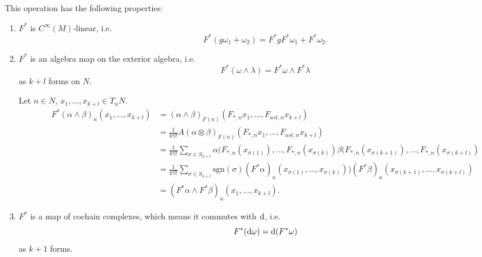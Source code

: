 This operation has the following properties:
\begin{enumerate}
  \item{
    $F^\ast$ is $C^\infty(M)$-linear, i.e.
    $$
      F^\ast(g \omega_1 + \omega_2)
    = F^\ast g F^\ast \omega_1 + F^\ast \omega_2.
    $$
  }
  \item{
    $F^\ast$ is an algebra map on the exterior algebra, i.e.
    $$
      F^\ast(\omega \wedge \lambda)
    = F^\ast \omega \wedge F^\ast \lambda
    $$
    as $k + l$ forms on $N$.

    Let $n \in N$, $x_1, \dots, x_{k+l} \in T_n N$.
    \begin{align*}
       F^\ast(\alpha \wedge \beta)_n(x_1, \dots, x_{k+l})
    &= (\alpha \wedge \beta)_{F(n)}
         (F_{\ast,n} x_1, \dots, F_{ast, n} x_{k+l}) \\
    &= \frac{1}{k! l!}
         A(\alpha \otimes \beta)_{F(n)}
           (F_{\ast,n} x_1, \dots, F_{ast, n} x_{k+l}) \\
    &= \frac{1}{k! l!}
         \sum_{\sigma \in S_{k+l}}
           \alpha(F_{\ast, n}(x_{\sigma(1)}),
                  \dots,
                  F_{\ast,n}(x_{\sigma(k)})
           \beta(F_{\ast, n}(x_{\sigma(k+1)}),
                 \dots,
                 F_{\ast, n}(x_{\sigma(k+l)}) \\
    &= \frac{1}{k! l!}
         \sum_{\sigma \in S_{k+l}}
           \mathrm{sgn}(\sigma)
             (F^\ast \alpha)_n
               (x_{\sigma(1)},
                \dots,
                x_{\sigma(k)}))
             (F^\ast \beta)_n
               (x_{\sigma(k+1)},
                \dots,
                x_{\sigma(k+l)}) \\
    &= (F^\ast \alpha \wedge F^\ast \beta)_n
         (x_1, \dots, x_{k+l}).
    \end{align*}
  }
  \item{
    $F^\ast$ is a map of cochain complexes, which means it commutes
    with $\mathop{}\!\mathrm{d}$, i.e.
    $$
      F^\ast(\mathop{}\!\mathrm{d} \omega)
    = \mathop{}\!\mathrm{d} (F^\ast \omega)
    $$
    as $k + 1$ forms.

}
\end{enumerate}
